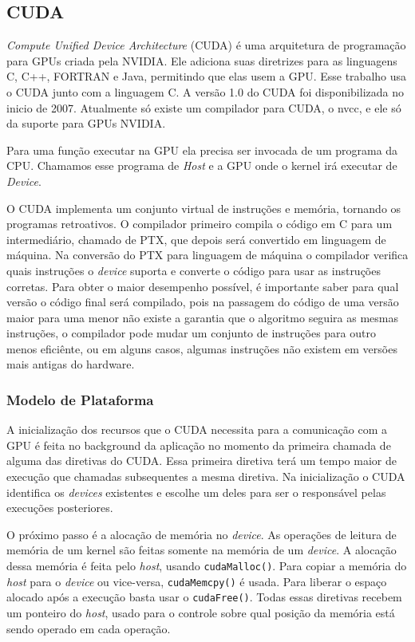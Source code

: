 \subsection{CUDA}
\textit{Compute Unified Device Architecture} (CUDA)\cite{cuda} é uma arquitetura de programação para GPUs criada pela NVIDIA.
Ele adiciona suas diretrizes para as linguagens C, C++, FORTRAN e Java, permitindo que elas usem a GPU.
Esse trabalho usa o CUDA junto com a linguagem C.
A versão 1.0 do CUDA foi disponibilizada no inicio de 2007. Atualmente só existe um compilador para CUDA, o nvcc,
e ele só da suporte para GPUs NVIDIA.

Para uma função executar na GPU ela precisa ser invocada de um programa da CPU. Chamamos esse programa de \textit{Host}
e a GPU onde o kernel irá executar de \textit{Device}.

O CUDA implementa um conjunto virtual de instruções e memória, tornando os programas retroativos. O compilador
primeiro compila o código em C para um intermediário, chamado de PTX, que depois será convertido em linguagem
de máquina. Na conversão do PTX para linguagem de máquina o compilador verifica quais instruções o \textit{device}
suporta e converte o código para usar as instruções corretas.
Para obter o maior desempenho possível, é importante saber para qual versão o código final será compilado, 
pois na passagem do código de uma versão maior para uma menor não existe a garantia que o algoritmo seguira as mesmas instruções, 
o compilador pode mudar um conjunto de instruções para outro menos eficiênte, ou em alguns casos, algumas instruções não existem em
versões mais antigas do hardware.

\subsubsection{Modelo de Plataforma}
A inicialização dos recursos que o CUDA necessita para a comunicação com a GPU é feita no background da
aplicação no momento da primeira chamada de alguma das diretivas do CUDA. Essa primeira diretiva terá um
tempo maior de execução que chamadas subsequentes a mesma diretiva. Na inicialização o CUDA identifica
os \textit{devices} existentes e escolhe um deles para ser o responsável pelas execuções posteriores.

O próximo passo é a alocação de memória no \textit{device}. As operações de leitura de memória de um kernel são feitas somente
na memória de um \textit{device}. A alocação dessa memória é feita pelo \textit{host}, usando \verb#cudaMalloc()#. 
Para copiar a memória do \textit{host} para o \textit{device} ou vice-versa,
\verb#cudaMemcpy()# é usada. Para liberar o espaço alocado após a execução basta usar o \verb#cudaFree()#.
Todas essas diretivas recebem um ponteiro do \textit{host}, usado para o controle sobre qual posição da memória está sendo
operado em cada operação.


